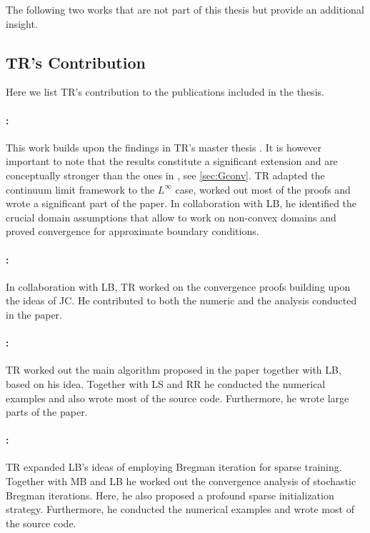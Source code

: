 \printbibliography[keyword={papersA}, resetnumbers=true, heading=none]
\printbibliography[keyword={papersB}, resetnumbers=true, heading=none]

The following two works that are not part of this thesis but provide an additional insight.

\printbibliography[keyword={papersC}, resetnumbers=true, heading=none]

\subsection*{TR's Contribution}

Here we list TR's contribution to the publications included in the thesis.

\paragraph{\cite{roith2022continuum}:} This work builds upon the findings in TR's master thesis \cite{roith2022msc}. It is however important to note that the results constitute a significant extension and are conceptually stronger than the ones in \cite{roith2022msc}, see \cref{sec:Gconv}. TR adapted the continuum limit framework to the $L^\infty$ case, worked out most of the proofs and wrote a significant part of the paper. In collaboration with LB, he identified the crucial domain assumptions that allow to work on non-convex domains and proved convergence for approximate boundary conditions.

\paragraph{\cite{bungert2021uniform}:} In collaboration with LB, TR worked on the convergence proofs building upon the ideas of JC. He contributed to both the numeric and the analysis conducted in the paper.

\paragraph{\cite{bungert2021clip}:} TR worked out the main algorithm proposed in the paper together with LB, based on his idea. Together with LS and RR he conducted the numerical examples and also wrote most of the source code. Furthermore, he wrote large parts of the paper.

\paragraph{\cite{bungert2022bregman}:} TR expanded LB's ideas of employing Bregman iteration for sparse training. Together with MB and LB he worked out the convergence analysis of stochastic Bregman iterations. Here, he also proposed a profound sparse initialization strategy. Furthermore, he conducted the numerical examples and wrote most of the source code.

